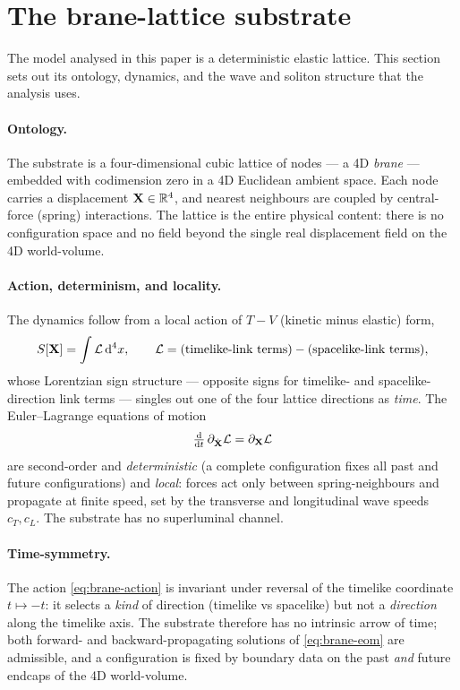 \section{The brane-lattice substrate}
\label{sec:substrate}

The model analysed in this paper is a deterministic elastic lattice. This section sets out its
ontology, dynamics, and the wave and soliton structure that the analysis uses.

\paragraph{Ontology.}
The substrate is a four-dimensional cubic lattice of nodes --- a 4D \emph{brane} --- embedded with
codimension zero in a 4D Euclidean ambient space. Each node carries a displacement
$\mathbf{X}\in\mathbb{R}^{4}$, and nearest neighbours are coupled by central-force (spring) interactions. The
lattice is the entire physical content: there is no configuration space and no field beyond the
single real displacement field on the 4D world-volume.

\paragraph{Action, determinism, and locality.}
The dynamics follow from a local action of $T-V$ (kinetic minus elastic) form,
\begin{equation}
  S[\mathbf{X}]=\int \mathcal{L}\,\mathrm{d}^4x ,\qquad
  \mathcal{L}=\text{(timelike-link terms)}-\text{(spacelike-link terms)} ,
  \label{eq:brane-action}
\end{equation}
whose Lorentzian sign structure --- opposite signs for timelike- and spacelike-direction link
terms --- singles out one of the four lattice directions as \emph{time}. The Euler--Lagrange
equations of motion
\begin{equation}
  \tfrac{\mathrm{d}}{\mathrm{d} t}\,\partial_{\dot{\mathbf{X}}}\mathcal{L}=\partial_{\mathbf{X}}\mathcal{L}
  \label{eq:brane-eom}
\end{equation}
are second-order and \emph{deterministic} (a complete configuration fixes all past and future
configurations) and \emph{local}: forces act only between spring-neighbours and propagate at
finite speed, set by the transverse and longitudinal wave speeds $c_T,c_L$. The substrate has no
superluminal channel.

\paragraph{Time-symmetry.}
The action \eqref{eq:brane-action} is invariant under reversal of the timelike coordinate
$t\mapsto -t$: it selects a \emph{kind} of direction (timelike vs spacelike) but not a
\emph{direction} along the timelike axis. The substrate therefore has no intrinsic arrow of time;
both forward- and backward-propagating solutions of \eqref{eq:brane-eom} are admissible, and a
configuration is fixed by boundary data on the past \emph{and} future endcaps of the 4D
world-volume.

